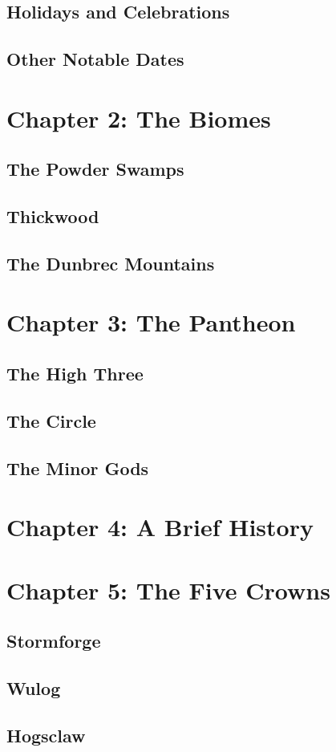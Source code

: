 \documentclass[10pt,twoside,twocolumn,openany]{book}
\begin{document}
		\section{Holidays and Celebrations}
		\section{Other Notable Dates}
	\chapter{Chapter 2: The Biomes}
		\section{The Powder Swamps}
		\section{Thickwood}
		\section{The Dunbrec Mountains}
	\chapter{Chapter 3: The Pantheon}
		\section{The High Three}
		\section{The Circle}
		\section{The Minor Gods}
	\chapter{Chapter 4: A Brief History}
	\chapter{Chapter 5: The Five Crowns}
		\section{Stormforge}
		\section{Wulog}
		\section{Hogsclaw}
	
	
\end{document}
